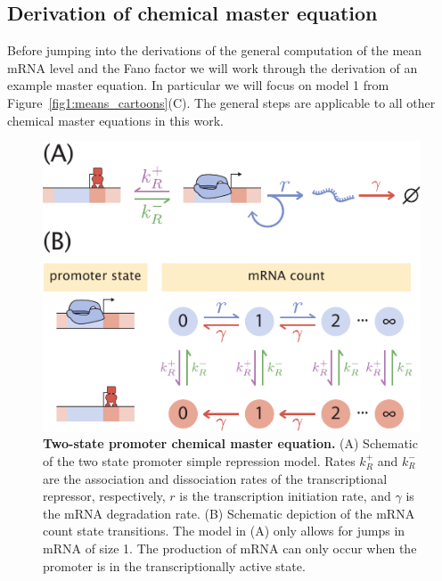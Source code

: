 \subsection{Derivation of chemical master equation}
\label{sec:cme_from_cartoon}

Before jumping into the derivations of the general computation of the mean mRNA
level and the Fano factor we will work through the derivation of an example
master equation. In particular we will focus on model 1 from
Figure~\ref{fig1:means_cartoons}(C). The general steps are applicable to all
other chemical master equations in this work.

\begin{figure}[h!]
\centering
\includegraphics{../../figures/si/figS0X_two_state.pdf}
\caption{
\textbf{Two-state promoter chemical master equation.}
(A) Schematic of the two state promoter simple repression model. Rates $k_R^+$
and $k_R^-$ are the association and dissociation rates of the transcriptional
repressor, respectively, $r$ is the transcription initiation rate, and $\gamma$
is the mRNA degradation rate. (B) Schematic depiction of the mRNA count state
transitions. The model in (A) only allows for jumps in mRNA of size 1. The
production of mRNA can only occur when the promoter is in the transcriptionally
active state.}
\label{fig:two_state}
\end{figure}

